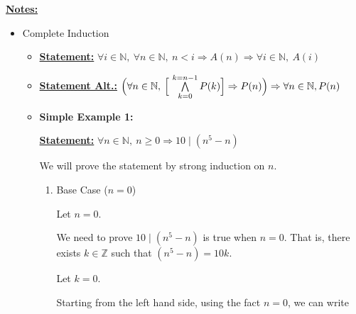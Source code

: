 \documentclass[12pt]{article}
\begin{document}
\begin{itemize}
\begin{mdframed}
    \end{mdframed}

    \bigskip

    \underline{\textbf{Notes:}}

    \bigskip

    \begin{itemize}
        \item Complete Induction
        \begin{itemize}
            \item \underline{\textbf{Statement:}} $\forall i \in \mathbb{N},\:\forall n \in \mathbb{N},\:n < i \Rightarrow A(n) \Rightarrow \forall i \in \mathbb{N},\:A(i)$
            \item \underline{\textbf{Statement Alt.:}} $\Bigl(\forall n \in \mathbb{N},\:\Bigl[ \ \bigwedge\limits_{k = 0}^{k=n-1} P(k) \Bigr] \Rightarrow P(n) \Bigr) \Rightarrow \forall n \in \mathbb{N}, P(n)$
            \item

            \begin{mdframed}
                \textbf{Simple Example 1:}

                \bigskip

                \underline{\textbf{Statement:}} $\forall n \in \mathbb{N},\:n \geq 0 \Rightarrow 10 \mid (n^5 - n)$

                \bigskip

                We will prove the statement by strong induction on $n$.

                \begin{enumerate}[1.]
                    \item Base Case ($n = 0$)

                    \begin{mdframed}

                    Let $n = 0$.

                    \bigskip

                    We need to prove $10 \mid (n^5 - n)$ is true when $n = 0$. That is,
                    there exists $k \in \mathbb{Z}$ such that $(n^5 - n) = 10k$.

                    \bigskip

                    Let $k = 0$.

                    \bigskip

                    Starting from the left hand side, using the fact $n = 0$,
                    we can write


\end{mdframed}
\end{enumerate}
\end{mdframed}
\end{itemize}
\end{itemize}
\end{itemize}
\end{document}
